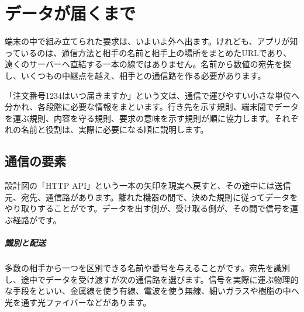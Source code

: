 \chapter{データが届くまで}
\label{chap:network}

\begin{chapterabstract}
端末の中で組み立てられた要求は、いよいよ外へ出ます。けれども、アプリが知っているのは、通信方法と相手の名前と相手上の場所をまとめたURLであり、遠くのサーバーへ直結する一本の線ではありません。名前から数値の宛先を探し、いくつもの中継点を越え、相手との通信路を作る必要があります。

「注文番号1234はいつ届きますか」という文は、通信で運びやすい小さな単位へ分かれ、各段階に必要な情報をまといます。行き先を示す規則、端末間でデータを運ぶ規則、内容を守る規則、要求の意味を示す規則が順に協力します。それぞれの名前と役割は、実際に必要になる順に説明します。
\end{chapterabstract}


\section{通信の要素}
\label{sec:05-network-01}

設計図の「HTTP API」という一本の矢印を現実へ戻すと、その途中には送信元、宛先、通信路があります。離れた機器の間で、決めた規則に従ってデータをやり取りすることがです。データを出す側が、受け取る側が、その間で信号を運ぶ経路がです。

\begingroup
\begingroup
      \centering
      \vspace{5mm}
\paragraph{識別と配送}
        多数の相手から一つを区別できる名前や番号を与えることがです。宛先を識別し、途中でデータを受け渡すが次の通信路を選びます。信号を実際に運ぶ物理的な手段をといい、金属線を使う有線、電波を使う無線、細いガラスや樹脂の中へ光を通す光ファイバーなどがあります。

